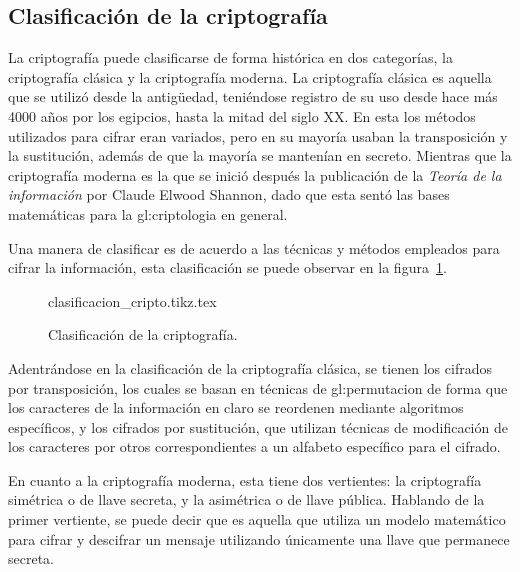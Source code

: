 %
%

\subsection{Clasificación de la criptografía}
\label{sec:clasificacion}

La criptografía puede clasificarse de forma histórica en dos categorías,
la criptografía clásica y la criptografía moderna. La criptografía clásica
es aquella que se utilizó desde la antigüedad, teniéndose registro de su
uso desde hace más 4000 años por los egipcios, hasta la mitad del siglo
XX. En esta los métodos utilizados para cifrar eran variados, pero en su
mayoría usaban la transposición y la sustitución, además de que la mayoría
se mantenían en secreto. Mientras que la criptografía moderna es la que
se inició después la publicación de la \textit{Teoría de la información}
por Claude Elwood Shannon\cite{shannon_teoria}, dado que esta sentó las
bases matemáticas para la \gls{gl:criptologia} en general.

Una manera de clasificar es de acuerdo a las técnicas y métodos empleados
para cifrar la información, esta clasificación se puede observar en la
figura~\ref{clasificacion_cripto}.

\begin{figure}
  \begin{center}
    {clasificacion_cripto.tikz.tex}
    \caption{Clasificación de la criptografía.}
    \label{clasificacion_cripto}
  \end{center}
\end{figure}

Adentrándose en la clasificación de la criptografía clásica, se tienen los
cifrados por transposición, los cuales se basan en técnicas de
\gls{gl:permutacion} de forma que los caracteres de la información en claro
se reordenen mediante algoritmos específicos, y los cifrados por sustitución,
que utilizan técnicas de modificación de los caracteres por otros
correspondientes a un alfabeto específico para el cifrado.

En cuanto a la criptografía moderna, esta tiene dos vertientes: la
criptografía simétrica o de llave secreta, y la asimétrica o de llave
pública. Hablando de la primer vertiente, se puede decir que es aquella
que utiliza un modelo matemático para cifrar y descifrar un mensaje
utilizando únicamente una llave que permanece secreta.

